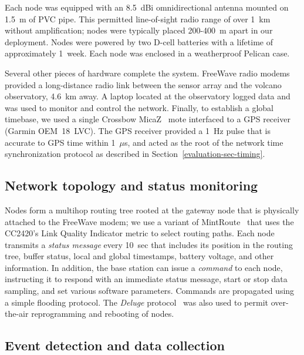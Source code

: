 Each node was equipped with an 8.5~dBi omnidirectional antenna mounted on
1.5~m of PVC pipe.  This permitted line-of-sight radio range of over 1~km
without amplification; nodes were typically placed 200-400~m apart in our
deployment. Nodes were powered by two D-cell batteries with a lifetime of
approximately 1~week.  Each node was enclosed in a weatherproof Pelican case.

Several other pieces of hardware complete the system. FreeWave radio modems
provided a long-distance radio link between the sensor array and the volcano
observatory, 4.6~km away. A laptop located at the observatory logged data and
was used to monitor and control the network.  Finally, to establish a global
timebase, we used a single Crossbow MicaZ~\cite{xbow} mote interfaced to a
GPS receiver (Garmin OEM~18~LVC).  The GPS receiver provided a 1~Hz pulse
that is accurate to GPS time within 1~$\mu$s, and acted as the root of the
network time synchronization protocol as described in
Section~\ref{evaluation-sec-timing}.

\subsection{Network topology and status monitoring}

Nodes form a multihop routing tree rooted at the gateway node that is
physically attached to the FreeWave modem; we use a variant of
MintRoute~\cite{awoo-multihop} that uses the CC2420's Link Quality Indicator
metric to select routing paths. Each node transmits a {\em status message}
every 10~sec that includes its position in the routing tree, buffer status,
local and global timestamps, battery voltage, and other information. 
In addition, the base station can issue a {\em command} to each node,
instructing it to respond with an immediate status message, start or stop
data sampling, and set various software parameters.  Commands are propagated
using a simple flooding protocol.  The {\em Deluge} protocol~\cite{deluge}
was also used to permit over-the-air reprogramming and rebooting of nodes.

\subsection{Event detection and data collection}

